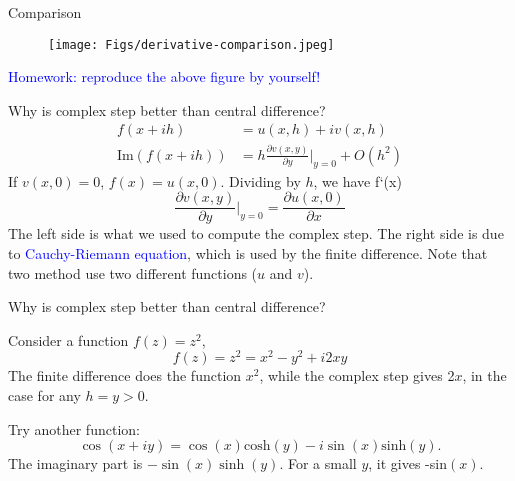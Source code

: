 \documentclass{beamer}
\begin{document}
\begin{frame}{Comparison}

\begin{figure}
\centering
\texttt{[image: Figs/derivative-comparison.jpeg]}
\end{figure}

\textcolor{blue}{Homework: reproduce the above figure by yourself!}
\end{frame}

\begin{frame}{Why is complex step better than central difference?}
\begin{equation*}
\begin{split}
    f(x+ih) &= u(x,h) + iv(x,h)\\
    \textrm{Im}(f(x+ih)) &= h\frac{\partial v(x, y)}{\partial y}|_{y=0} + O(h^2)
\end{split}
\end{equation*}
If $v(x,0)=0$, $f(x)=u(x,0)$. Dividing by $h$, we have f`(x)
\begin{equation*}
    \frac{\partial v(x, y)}{\partial y}|_{y=0} = \frac{\partial u(x, 0)}{\partial x}
\end{equation*}
The left side is what we used to compute the complex step. The right side is due to \textcolor{blue}{Cauchy-Riemann equation}, which is used by the finite difference. Note that two method use two different functions ($u$ and $v$).


\end{frame}

\begin{frame}{Why is complex step better than central difference?}

Consider a function $f(z) = z^2$, 
\begin{equation*}
    f(z) = z^2 = x^2 - y^2 + i2xy
\end{equation*}
The finite difference does the function $x^2$, while the complex step gives 2$x$, in the case for any $h=y>0$.
\vspace{10mm}

\pause
Try another function:
\begin{equation*}
    \cos(x+iy)=\cos(x)\textrm{cosh}(y) - i\sin(x)\textrm{sinh}(y).
\end{equation*}
The imaginary part is $−\sin(x)\sinh(y)$. For a small $y$, it gives -sin$(x)$.

\end{frame}
\end{document}
